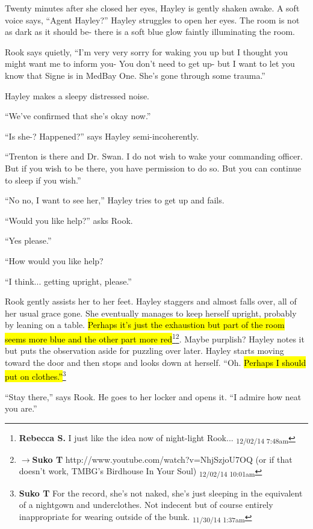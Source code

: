 Twenty minutes after she closed her eyes, Hayley is gently shaken awake.  A soft voice says, ``Agent Hayley?''  Hayley struggles to open her eyes.  The room is not as dark as it should be- there is a soft blue glow faintly illuminating the room.  

Rook says quietly, ``I'm very very sorry for waking you up but I thought you might want me to inform you- You don't need to get up- but I want to let you know that Signe is in MedBay One.  She's gone through some trauma.''

Hayley makes a sleepy distressed noise.

``We've confirmed that she's okay now.''

``Is she-?  Happened?'' says Hayley semi-incoherently.

``Trenton is there and Dr. Swan.  I do not wish to wake your commanding officer.  But if you wish to be there, you have permission to do so.  But you can continue to sleep if you wish.''

``No no, I want to see her,'' Hayley tries to get up and fails.

``Would you like help?'' asks Rook.

``Yes please.''

``How would you like help?

``I think... getting upright, please.''

Rook gently assists her to her feet.  Hayley staggers and almost falls over, all of her usual grace gone.  She eventually manages to keep herself upright, probably by leaning on a table.  \hl{Perhaps it's just the exhaustion but part of the room seems more blue and the other part more red}\footnote{\textbf{Rebecca S. }I just like the idea now of night-light Rook... \textsubscript{12/02/14 7:48am}}\footnote{$\rightarrow$\textbf{Suko T }http://www.youtube.com/watch?v=NhjSzjoU7OQ
(or if that doesn't work, TMBG's Birdhouse In Your Soul) \textsubscript{12/02/14 10:01am}}.  Maybe purplish?  Hayley notes it but puts the observation aside for puzzling over later.  Hayley starts moving toward the door and then stops and looks down at herself.  ``Oh.  \hl{Perhaps I should put on clothes.''}\footnote{\textbf{Suko T }For the record, she's not naked, she's just sleeping in the equivalent of a nightgown and underclothes.  Not indecent but of course entirely inappropriate for wearing outside of the bunk. \textsubscript{11/30/14 1:37am}}

``Stay there,'' says Rook.  He goes to her locker and opens it.  ``I admire how neat you are.''

